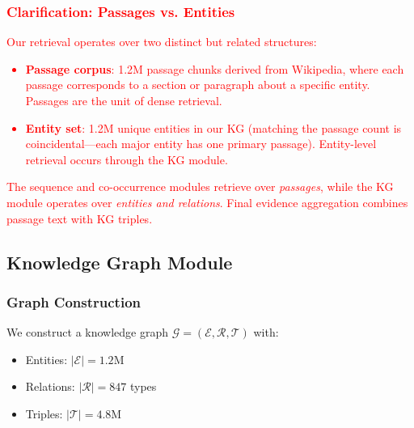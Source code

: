 \documentclass[10pt,twocolumn]{article}
\newcommand{\revisioncritical}[1]{\textcolor{red}{#1}}
\begin{document}
\revisioncritical{
\subsubsection{Clarification: Passages vs. Entities}
\label{sec:passages_entities}

Our retrieval operates over two distinct but related structures:

\begin{itemize}
    \item \textbf{Passage corpus}: 1.2M passage chunks derived from Wikipedia, where each passage corresponds to a section or paragraph about a specific entity. Passages are the unit of dense retrieval.
    \item \textbf{Entity set}: 1.2M unique entities in our KG (matching the passage count is coincidental---each major entity has one primary passage). Entity-level retrieval occurs through the KG module.
\end{itemize}

The sequence and co-occurrence modules retrieve over \textit{passages}, while the KG module operates over \textit{entities and relations}. Final evidence aggregation combines passage text with KG triples.
}


\subsection{Knowledge Graph Module}
\label{sec:ontology}

\subsubsection{Graph Construction}

We construct a knowledge graph $\mathcal{G} = (\mathcal{E}, \mathcal{R}, \mathcal{T})$ with:
\begin{itemize}
    \item Entities: $|\mathcal{E}| = 1.2$M
    \item Relations: $|\mathcal{R}| = 847$ types
    \item Triples: $|\mathcal{T}| = 4.8$M
\end{itemize}
\end{document}
